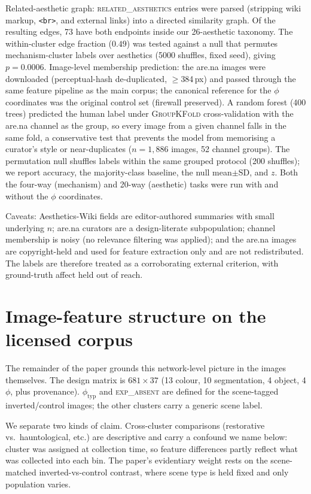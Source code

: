 \documentclass[11pt]{article}
\begin{document}
Related-aesthetic graph: \textsc{related\_aesthetics} entries were parsed
(stripping wiki markup, \texttt{<br>}, and external links) into a directed similarity
graph. Of the resulting edges, 73 have both endpoints inside our 26-aesthetic taxonomy.
The within-cluster edge fraction ($0.49$) was tested against a null that permutes
mechanism-cluster labels over aesthetics (5000 shuffles, fixed seed), giving $p=0.0006$.
Image-level membership prediction: the are.na images were downloaded
(perceptual-hash de-duplicated, $\geq$384\,px) and passed through the same feature pipeline
as the main corpus; the canonical reference for the $\phi$ coordinates was the original
control set (firewall preserved). A random forest (400 trees) predicted the human label
under \textsc{GroupKFold} cross-validation with the are.na channel as the group, so
every image from a given channel falls in the same fold, a conservative test that prevents
the model from memorising a curator's style or near-duplicates ($n=1{,}886$ images, 52
channel groups). The permutation null shuffles labels within the same grouped protocol (200
shuffles); we report accuracy, the majority-class baseline, the null mean$\pm$SD, and $z$.
Both the four-way (mechanism) and 20-way (aesthetic) tasks were run with and without the
$\phi$ coordinates.

Caveats: Aesthetics-Wiki fields are editor-authored summaries with small underlying $n$;
are.na curators are a design-literate subpopulation; channel membership is noisy (no
relevance filtering was applied); and the are.na images are copyright-held and used for
feature extraction only and are not redistributed. The labels are therefore treated as a
corroborating external criterion, with ground-truth affect held out of reach.

\section{Image-feature structure on the licensed corpus}
\label{sup:imgstruct}


The remainder of the paper grounds this network-level picture in the images themselves. The
design matrix is $681\times37$ (13 colour, 10 segmentation, 4 object, 4 $\phi$, plus
provenance). $\phi_{\text{typ}}$ and \textsc{exp\_absent} are defined for the
scene-tagged inverted/control images; the other clusters carry a generic scene label.

We separate two kinds of claim. Cross-cluster comparisons (restorative vs.\
hauntological, etc.) are descriptive and carry a confound we name below: cluster was
assigned at collection time, so feature differences partly reflect what was collected
into each bin. The paper's evidentiary weight rests on the scene-matched
inverted-vs-control contrast, where scene type is held fixed and only population varies.
\end{document}
